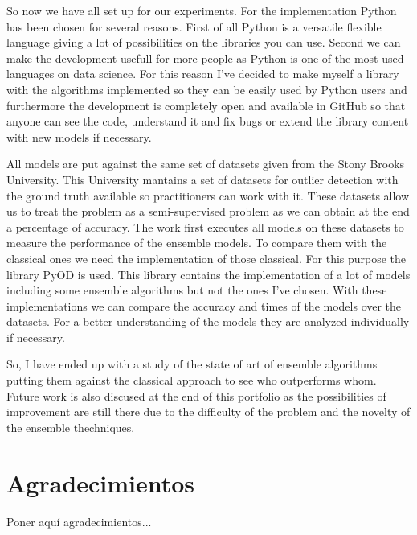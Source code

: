 So now we have all set up for our experiments. For the implementation Python has been chosen for several reasons. First of all Python is a versatile flexible language giving a lot of possibilities on the libraries you can use. Second we can make the development usefull for more people as Python is one of the most used languages on data science. For this reason I've decided to make myself a library with the algorithms implemented so they can be easily used by Python users and furthermore the development is completely open and available in GitHub so that anyone can see the code, understand it and fix bugs or extend the library content with new models if necessary.

All models are put against the same set of datasets given from the Stony Brooks University. This University mantains a set of datasets for outlier detection with the ground truth available so practitioners can work with it. These datasets allow us to treat the problem as a semi-supervised problem as we can obtain at the end a percentage of accuracy. The work first executes all models on these datasets to measure the performance of the ensemble models. To compare them with the classical ones we need the implementation of those classical. For this purpose the library PyOD is used. This library contains the implementation of a lot of models including some ensemble algorithms but not the ones I've chosen. With these implementations we can compare the accuracy and times of the models over the datasets. For a better understanding of the models they are analyzed individually if necessary.

So, I have ended up with a study of the state of art of ensemble algorithms putting them against the classical approach to see who outperforms whom. Future work is also discused at the end of this portfolio as the possibilities of improvement are still there due to the difficulty of the problem and the novelty of the ensemble thechniques.

\chapter*{Agradecimientos}
\thispagestyle{empty}

       \vspace{1cm}


Poner aquí agradecimientos...

